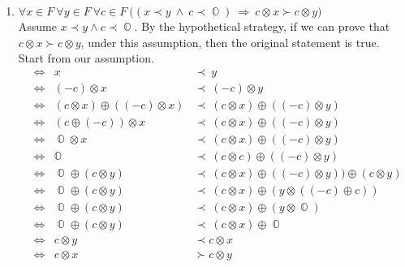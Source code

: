 \documentclass[11pt]{article}
\numberwithin{equation}{section}
\DeclareMathOperator*{\OO}{\mathbb{O}}
\DeclareMathOperator*{\+}{\oplus}
\DeclareMathOperator*{\x}{\otimes}
\DeclareMathOperator*{\fl}{\prec} %
\DeclareMathOperator*{\fg}{\succ} %
\DeclareMathOperator*{\Lra}{\Leftrightarrow}
\begin{document}
   \begin{enumerate}[label= 1.\arabic*, itemsep=0.2cm]
     \item %
       $\forall x \in F \ \forall y \in F \ \forall c  \in F \ \Big ( (x \fl y \ \land \ c \fl \OO) \ \Rightarrow \ c \x x \fg c \x y \Big ) $\\
       \iffalse 
       First: prove $(-a)\x b = - (a \x b)$.\\
       $-(a \x b)$ is additive inverse of $(a \x b)$. we know that by axiom 4, $-(a \x b) \+ (a \x b) = \OO$, 
       \begin{align*}
         ((-a) \x b) \+ (a \x b) &= b \x (-a \+ a)  \\ %
                                 &=  b \x \OO \\ %
                                 &= \OO %
       \end{align*}
        since both equal $\OO$, blah blah\\
      \fi
Assume $x \fl y \land c \fl \OO$. By the hypothetical strategy, if we can prove that \\ $c \x x \fg c \x y$, under this assumption, then the original statement is true. Start from our assumption.
       \begin{align*}
          &\Lra& x &\fl \ y \\ 
         &\Lra& (-c)\x x &\fl\ (-c) \x y \\%
          &\Lra& (c \x x) \+ ((-c) \x x) &\fl\ (c\x x) \+((-c)\x y) \\%
          &\Lra& (c \+ (-c))\x x &\fl\ (c\x x) \+((-c)\x y) \\%
          &\Lra& \OO \x x &\fl\ (c\x x) \+((-c)\x y) \\%
        &\Lra&\OO &\fl\ (c\x c)\+((-c)\x y)\\%
        &\Lra& \OO \+ (c \x y) &\fl\ (c \x x) \+ ((-c) \x y))\+(c\x y) \\ %
        &\Lra& \OO \+ (c\x y) &\fl\ (c \x x) \+ (y \x ((-c) \+ c)) \\ %
        &\Lra& \OO \+ (c\x y) &\fl\ (c \x x) \+ (y \x \OO) \\ %
        &\Lra& \OO \+ (c\x y) &\fl\ (c \x x) \+ \OO \\ %
           &\Lra& c \x y &\fl c \x x \\%
        &\Lra& c \x x &\fg c \x y %
       \end{align*}

\end{enumerate}
\end{document}
